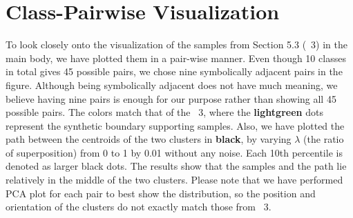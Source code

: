 \documentclass{article}
\newcommand{\aname}{Qimera\xspace}
\begin{document}
\begin{comment}
       \multirow{4}{*}{ImageNet} &   ResNet-50 & 4w4a &64.37 & 66.25 ($+$1.88) \\
            & (77.73) &5w5a &       74.13     &   75.32 ($+$1.19)\\
            \cmidrule(lr){2-5}
            
            & MobileNetV2 &  4w4a & 60.13 & 61.62 ($+$1.49)  \\
              & (73.03) &5w5a & 68.40 & 70.45 ($+$2.05)\\
               \bottomrule
          \end{tabular}}
\end{table}


Close to the Neurips 2021 deadline, a new paper named AutoReCon~\cite{autorecon} has appeared on arXiv that tackles the same data-free quantization problem.
AutoReCon improves the accuracy of the data-free quantization by applying neural AutoReConhitecture seAutoReConh to construct a better generator AutoReConhitecture.
In \tablename~\ref{tab:autorecon}, we provide a comparison based on the reported values from their paper. 
In all results that share the same setting, \aname outperforms AutoReCon by a significant margin.
Moreover, we believe schemes used in AutoReCon is orthogonal to ours because the generator discovered by AutoReCon can be used with \aname to provide extra performance gain.

\end{comment}




\section{Class-Pairwise Visualization}
To look closely onto the visualization of the samples from Section 5.3 (\figurename~3) in the main body, we have plotted them in a pair-wise manner.
Even though 10 classes in total gives 45 possible pairs, we chose nine symbolically adjacent pairs in the figure.
Although being symbolically adjacent does not have much meaning, we believe having nine pairs is enough for our purpose rather than showing all 45 possible pairs.
The colors match that of the \figurename~3, where the \textbf{{\color{emerald}lightgreen}} dots represent the synthetic boundary supporting samples. 
Also, we have plotted the path between the centroids of the two clusters in \textbf{black}, by varying $\lambda$ (the ratio of superposition) from 0 to 1 by 0.01 without any noise.
Each 10th percentile is denoted as larger black dots.
The results show that the samples and the path lie relatively in the middle of the two clusters.
Please note that we have performed PCA plot for each pair to best show the distribution, so the position and orientation of the clusters do not exactly match those from \figurename~3.
\end{document}
